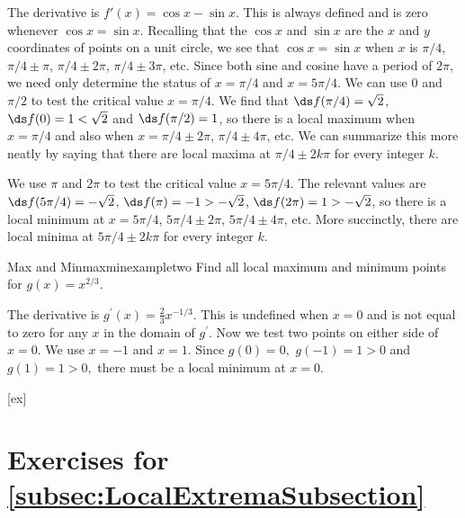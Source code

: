 \begin{solution} 
	The derivative is $f'(x)=\cos x-\sin x$. This is
	always defined and is zero whenever $\cos x=\sin x$. Recalling that
	the $\cos x$ and $\sin x$ are the $x$ and $y$ coordinates of points on
	a unit circle, we see that $\cos x=\sin x$ when $x$ is $\pi/4$, 
	$\pi/4\pm\pi$, $\pi/4\pm2\pi$, $\pi/4\pm3\pi$, etc. Since both sine
	and cosine have a period of $2\pi$, we need only determine the status
	of $x=\pi/4$ and $x=5\pi/4$. We can use $0$ and $\pi/2$ to test the
	critical value $x= \pi/4$. 
	We find that $\ds f(\pi/4)=\sqrt{2}$, $\ds f(0)=1<\sqrt{2}$ and $\ds f(\pi/2)=1$,
	so there is a local maximum when $x=\pi/4$ and also when
	$x=\pi/4\pm2\pi$, $\pi/4\pm4\pi$, etc. We can summarize this more
	neatly by saying that there are local maxima at $\pi/4\pm 2k\pi$ for
	every integer $k$.
	
	We use $\pi$ and $2\pi$ to test the critical value $x=5\pi/4$. The
	relevant values are $\ds f(5\pi/4)=-\sqrt2$, $\ds f(\pi)=-1>-\sqrt2$,
	$\ds f(2\pi)=1>-\sqrt2$, so there is a local minimum at $x=5\pi/4$,
	$5\pi/4\pm2\pi$, $5\pi/4\pm4\pi$, etc. More succinctly, there are
	local minima at $5\pi/4\pm 2k\pi$ for
	every integer $k$.
\end{solution}

\begin{example}{Max and Min}{maxminexampletwo}
	Find all local maximum and minimum points for $g\left( x\right) =x^{2/3}$.
\end{example}
\begin{solution}
	The derivative is $g^{\prime }\left( x\right) =\frac{2}{3}%
	x^{-1/3}. $ This is undefined when $x=0$ and is not equal to zero for any $x$
	in the domain of $g^{\prime }.$ Now we test two points on either side of $%
	x=0.$ We use $x=-1$ and $x=1.$ Since $g\left( 0\right) =0,$ $g\left(
	-1\right) =1>0$ and $g\left( 1\right) =1>0,$ there must be a local minimum
	at $x=0$.
\end{solution}



[ex]
\section*{Exercises for \ref{subsec:LocalExtremaSubsection}}

